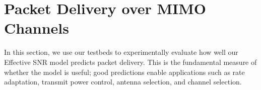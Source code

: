 \ifx\mainfile\undefined

\setcounter{chapter}{5} %
\fi

\cleardoublepage
\chapter{Packet Delivery over MIMO Channels}
\label{chap:delivery}

In this section, we use our testbeds to experimentally evaluate how well our Effective SNR model predicts packet delivery. This is the fundamental measure of whether the model is useful; good predictions enable applications such as rate adaptation, transmit power control, antenna selection, and channel selection.

\begin{figure}[ht]
	\centering
	\hfill%
	

\end{figure}
